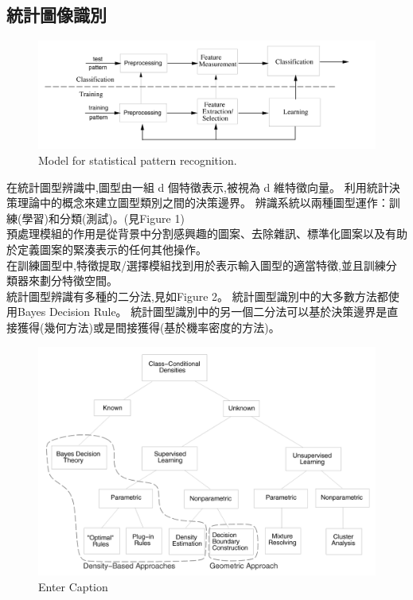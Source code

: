 \documentclass[10pt, a4paper]{article}
\begin{document}
\begin{CJK*}{UTF8}{bsmi}
\section{統計圖像識別}
\begin{figure}[H]
    \centering
    \includegraphics[width=0.9\linewidth]{Model for statistical pattern recognition.PNG}
    \caption{Model for statistical pattern recognition.}
    \label{fig:enter-label}
\end{figure}
在統計圖型辨識中,圖型由一組 d 個特徵表示,被視為 d 維特徵向量。 
利用統計決策理論中的概念來建立圖型類別之間的決策邊界。 
辨識系統以兩種圖型運作：訓練(學習)和分類(測試)。(見Figure 1) \\[0.5em]
預處理模組的作用是從背景中分割感興趣的圖案、去除雜訊、標準化圖案以及有助於定義圖案的緊湊表示的任何其他操作。\\[0.5em]
在訓練圖型中,特徵提取/選擇模組找到用於表示輸入圖型的適當特徵,並且訓練分類器來劃分特徵空間。\\[0.5em]
統計圖型辨識有多種的二分法,見如Figure 2。
統計圖型識別中的大多數方法都使用Bayes Decision Rule。
統計圖型識別中的另一個二分法可以基於決策邊界是直接獲得(幾何方法)或是間接獲得(基於機率密度的方法)。
\begin{figure}[H]
    \centering
    \includegraphics[width=0.9\linewidth]{Various approaches in statistical pattern recognition.PNG}
    \caption{Enter Caption}
    \label{fig:enter-label}
\end{figure}


\end{CJK*}
\end{document}
